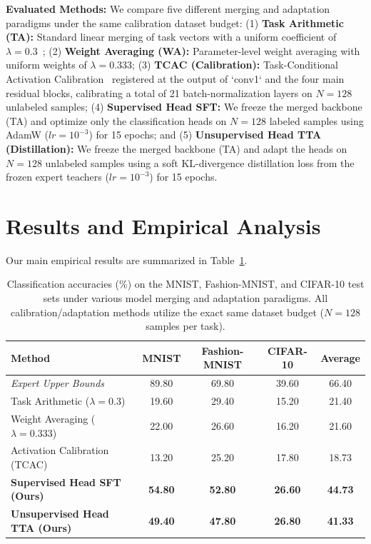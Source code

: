 \documentclass{article}
\theoremstyle{plain}
\theoremstyle{definition}
\theoremstyle{remark}
\begin{document}
\textbf{Evaluated Methods:} We compare five different merging and adaptation paradigms under the same calibration dataset budget: (1) \textbf{Task Arithmetic (TA):} Standard linear merging of task vectors with a uniform coefficient of $\lambda = 0.3$~\cite{ilharco2022editing}; (2) \textbf{Weight Averaging (WA):} Parameter-level weight averaging with uniform weights of $\lambda = 0.333$; (3) \textbf{TCAC (Calibration):} Task-Conditional Activation Calibration~\cite{tcac2026} registered at the output of `conv1` and the four main residual blocks, calibrating a total of 21 batch-normalization layers on $N=128$ unlabeled samples; (4) \textbf{Supervised Head SFT:} We freeze the merged backbone (TA) and optimize only the classification heads on $N=128$ labeled samples using AdamW ($lr=10^{-3}$) for 15 epochs; and (5) \textbf{Unsupervised Head TTA (Distillation):} We freeze the merged backbone (TA) and adapt the heads on $N=128$ unlabeled samples using a soft KL-divergence distillation loss from the frozen expert teachers ($lr=10^{-3}$) for 15 epochs.

\section{Results and Empirical Analysis}
\label{sec:results}

Our main empirical results are summarized in Table~\ref{tab:main_results}.

\begin{table}[t]
\caption{Classification accuracies (\%) on the MNIST, Fashion-MNIST, and CIFAR-10 test sets under various model merging and adaptation paradigms. All calibration/adaptation methods utilize the exact same dataset budget ($N=128$ samples per task).}
\label{tab:main_results}
\begin{center}
\begin{tabular}{lcccc}
\toprule
\textbf{Method} & \textbf{MNIST} & \textbf{Fashion-MNIST} & \textbf{CIFAR-10} & \textbf{Average} \\
\midrule
\textit{Expert Upper Bounds} & 89.80 & 69.80 & 39.60 & 66.40 \\
\midrule
Task Arithmetic ($\lambda = 0.3$) & 19.60 & 29.40 & 15.20 & 21.40 \\
Weight Averaging ($\lambda = 0.333$) & 22.00 & 26.60 & 16.20 & 21.60 \\
\midrule
Activation Calibration (TCAC) & 13.20 & 25.20 & 17.80 & 18.73 \\
\midrule
\textbf{Supervised Head SFT (Ours)} & \textbf{54.80} & \textbf{52.80} & \textbf{26.60} & \textbf{44.73} \\
\textbf{Unsupervised Head TTA (Ours)} & \textbf{49.40} & \textbf{47.80} & \textbf{26.80} & \textbf{41.33} \\
\bottomrule
\end{tabular}
\end{center}
\end{table}
\end{document}
